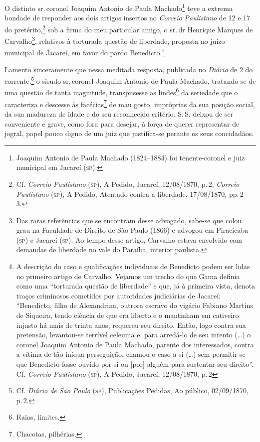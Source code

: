 O distinto sr.\,coronel Joaquim Antonio de Paula Machado\footnote{
  Joaquim Antonio de Paula Machado (1824--1884) foi tenente-coronel e
  juiz municipal em Jacareí (\textsc{sp}).} teve a extrema bondade de responder
aos dois artigos insertos no \emph{Correio Paulistano} de 12 e 17 do
pretérito,\footnote{ Cf. \emph{Correio Paulistano} (\textsc{sp}), A Pedido,
  Jacareí, 12/08/1870, p.\,2; \emph{Correio Paulistano} (\textsc{sp}), A Pedido,
  Atentado contra a liberdade, 17/08/1870, pp.\,2--3.} sob a firma do meu
particular amigo, o sr.\,dr Henrique Marques de Carvalho\footnote{ Das
  raras referências que se encontram desse advogado, sabe-se que colou
  grau na Faculdade de Direito de São Paulo (1866) e advogou em
  Piracicaba (\textsc{sp}) e Jacareí (\textsc{sp}). Ao tempo desse artigo, Carvalho estava
  envolvido com demandas de liberdade no vale do Paraíba, interior
  paulista.}, relativos à torturada questão de liberdade, proposta no
juízo municipal de Jacareí, em favor do pardo Benedicto.\footnote{ A
  descrição do caso e qualificações individuais de Benedicto podem ser
  lidas no primeiro artigo de Carvalho. Vejamos um trecho do que Gama
  definia como uma ``torturada questão de liberdade'' e que, já à primeira
  vista, denota traços criminosos cometidos por autoridades judiciárias
  de Jacareí: ``Benedicto, filho de Alexandrina, outrora escravo do
  vigário Fabiano Martins de Siqueira, tendo ciência de que era liberto
  e o mantinham em cativeiro injusto há mais de trinta anos, requereu
  seu direito. Então, logo contra sua pretensão, levantou-se terrível
  celeuma e, para arredá-lo de seu intento (\ldots{}) o coronel Joaquim
  Antonio de Paula Machado, parente dos interessados, contra a vítima de
  tão iníqua perseguição, chamou o caso a si (\ldots{}) sem permitir-se que
  Benedicto fosse ouvido por si ou {[}por{]} alguém para sustentar seu
  direito''. Cf. \emph{Correio Paulistano} (\textsc{sp}), A Pedido, Jacareí,
  12/08/1870, p.\,2}

Lamento sinceramente que nessa meditada resposta, publicada no
\emph{Diário} de 2 do corrente,\footnote{ Cf. \emph{Diário de São Paulo}
  (\textsc{sp}), Publicações Pedidas, Ao público, 02/09/1870, p.\,2.} o sisudo sr.\,coronel Joaquim Antonio de Paula Machado, tratando-se de uma questão de
tanta magnitude, transpusesse as lindes\footnote{ Raias, limites.} da
seriedade que o caracteriza e descesse às facécias\footnote{ Chacotas,
  pilhérias.} de mau gosto, impróprias da sua posição social, da sua
madureza de idade e do seu reconhecido critério. S.\,S. deixou de ser
conveniente e grave, como fora para desejar, à força de querer
representar de jogral, papel pouco digno de um juiz que justifica-se
perante os seus concidadãos.

